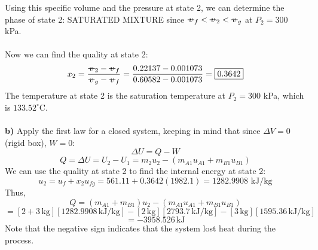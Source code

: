 \documentclass[12pt]{article}
\newcommand{\svol}{%
  \mathord{\text{\ooalign{%
    \hfil$v$\hfil\cr
    \hfil\rule[0.6ex]{0.8em}{0.5pt}\hfil
  }}}%
}
\begin{document}
Using this specific volume and the pressure at state 2, we can determine the phase of state 2: SATURATED MIXTURE since $\svol_f < \svol_2 < \svol_g$ at $P_2 = 300$ kPa.\\\\
Now we can find the quality at state 2:
\[x_2 = \frac{\svol_2 - \svol_f}{\svol_{g} - \svol_f} = \frac{0.22137 - 0.001073}{0.60582-0.001073} = \boxed{0.3642}\]
The temperature at state 2 is the saturation temperature at $P_2 = 300$ kPa, which is $\boxed{133.52^\circ\text{C}}$.\\\\
\textbf{b)} Apply the first law for a closed system, keeping in mind that since $\Delta V = 0$ (rigid box), $W=0$:
\[\Delta U = Q - W\]
\[Q = \Delta U = U_2-U_1 = m_2u_2 - (m_{A1}u_{A1} + m_{B1}u_{B1})\]
We can use the quality at state 2 to find the internal energy at state 2:
\[u_2 = u_f + x_2 u_{fg} = 561.11 + 0.3642(1982.1) = 1282.9908 \text{ kJ/kg}\]
Thus,
\[Q = (m_{A1}+m_{B1})u_2 - (m_{A1}u_{A1} + m_{B1}u_{B1})\]
\[= [2+3\,\text{kg}][1282.9908\,\text{kJ/kg}] - [2\,\text{kg}][2793.7\,\text{kJ/kg}] - [3\,\text{kg}][1595.36\,\text{kJ/kg}]\]
\[= \boxed{-3958.526\,\text{kJ}}\]
Note that the negative sign indicates that the system lost heat during the process.
\end{document}

